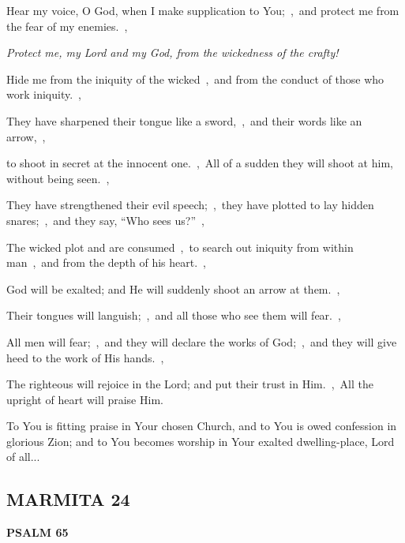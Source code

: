 \documentclass[12pt,twoside,a5paper]{article}
\newcommand{\marmita}[1]{\subsection*{MARMITA {#1}}}
\newcommand{\psalm}[1]{\textbf{PSALM {#1}}\nopagebreak}
\newcommand{\qanona}[1]{{\liturgicalhint{Qanona.} \emph{#1}}}
\newcommand{\slota}[1]{\liturgicalhint{Slota.} #1}
\begin{document}
\begin{normalparskip}
  Hear my voice, O God, when I make supplication to You;~\sep\ and protect me from the fear of my enemies.~\sep

  \qanona{Protect me, my Lord and my God, from the wickedness of the crafty!}

  Hide me from the iniquity of the wicked~\sep\ and from the conduct of those who work iniquity.~\sep

  They have sharpened their tongue like a sword,~\sep\ and their words like an arrow,~\sep

  to shoot in secret at the innocent one.~\sep\ All of a sudden they will shoot at him, without being seen.~\sep

  They have strengthened their evil speech;~\sep\ they have plotted to lay hidden snares;~\sep\ and they say, ``Who sees us?''~\sep

  The wicked plot and are consumed~\sep\ to search out iniquity from within man~\sep\ and from the depth of his heart.~\sep

  God will be exalted; and He will suddenly shoot an arrow at them.~\sep

  Their tongues will languish;~\sep\ and all those who see them will fear.~\sep

  All men will fear;~\sep\ and they will declare the works of God;~\sep\ and they will give heed to the work of His hands.~\sep

  The righteous will rejoice in the Lord; and put their trust in Him.~\sep\ All the upright of heart will praise Him.
\end{normalparskip}

\slota{To You is fitting praise in Your chosen Church, and to You is owed confession in glorious Zion; and to You becomes worship in Your exalted dwelling-place, Lord of all...}

\marmita{24}

\psalm{65}
\end{document}
